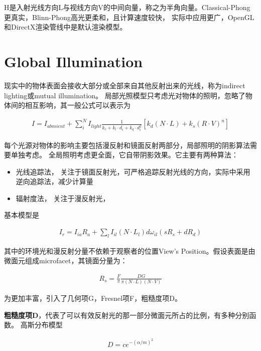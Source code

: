 H是入射光线方向L与视线方向V的中间向量，称之为半角向量。Classical-Phong更真实，Blinn-Phong高光更柔和，且计算速度较快，
实际中应用更广，OpenGL和DirectX渲染管线中是默认渲染模型。

\section{Global Illumination}
现实中的物体表面会接收大部分或全部来自其他反射出来的光线，称为indirect lighting或mutual illumination。
局部光照模型只考虑光对物体的照明，忽略了物体间的相互影响，其一般公式可以表示为

\begin{align*}
    I = I_{abmient} + \sum_{i}^{N}I_{light}\frac{1}{k_{c}+k_{l} \cdot d_{i} + k_{q} \cdot d_{i}^2}
    \left[ k_{d}(N \cdot L) + k_{s}(R \cdot V)^n \right]
\end{align*}

每个光源对物体的影响主要包括漫反射和镜面反射两部分，局部照明的阴影算法需要单独考虑。
\newline
全局照明考虑更全面，它自带阴影效果。它主要有两种算法：
\begin{itemize}
    \item {光线追踪法， 关注于镜面反射光，可严格追踪反射光线的方向，实际中采用逆向追踪法，减少计算量}
    \item {辐射度法， 关注于漫反射光，}
\end{itemize}
基本模型是 
\newline

\begin{align*}
    I_r = I_{ia}R_{a} + \sum_{l}I_{il}(N \cdot L_{l})d \omega_{il}(sR_{s} + dR_{d})
\end{align*}

其中的环境光和漫反射分量不依赖于观察者的位置View's Position。假设表面是由微面元组成microfacet，其镜面分量为：
\newline

\begin{align*}
    R_s = \frac{F}{\pi} \frac{DG}{\pi (N \cdot L)(N \cdot V)}
\end{align*}

为更加丰富，引入了几何项G，Fresnel项F，粗糙度项D。
\newline

\textbf{粗糙度项D}，代表了可以有效反射光的那一部分微面元所占的比例，有多种分别函数。
高斯分布模型
\newline

\begin{align*}
    D = ce^{-(\alpha / m)^2}
\end{align*}

